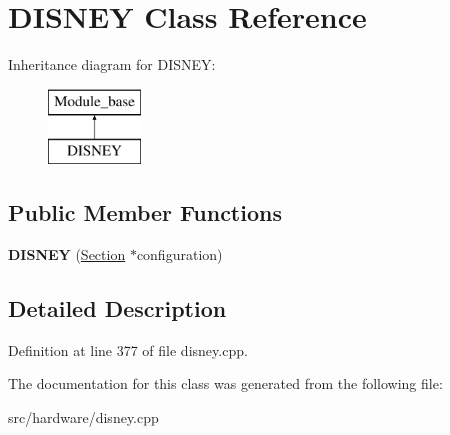 \hypertarget{classDISNEY}{\section{D\-I\-S\-N\-E\-Y Class Reference}
\label{classDISNEY}
}
Inheritance diagram for D\-I\-S\-N\-E\-Y\-:\begin{figure}[H]
\begin{center}
\leavevmode
\includegraphics[height=2.000000cm]{classDISNEY}
\end{center}
\end{figure}
\subsection*{Public Member Functions}
\begin{DoxyCompactItemize}
\item 
\hypertarget{classDISNEY_ae72a1674896a0bd37efde143c97e90d5}{{\bfseries D\-I\-S\-N\-E\-Y} (\hyperlink{classSection}{Section} $\ast$configuration)}\label{classDISNEY_ae72a1674896a0bd37efde143c97e90d5}

\end{DoxyCompactItemize}


\subsection{Detailed Description}


Definition at line 377 of file disney.\-cpp.



The documentation for this class was generated from the following file\-:\begin{DoxyCompactItemize}
\item 
src/hardware/disney.\-cpp\end{DoxyCompactItemize}
